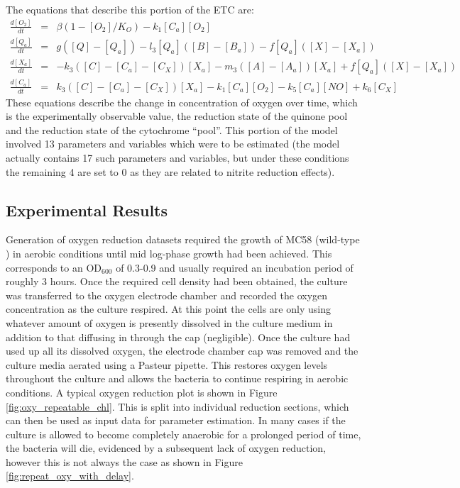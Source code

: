 The equations that describe this portion of the ETC are:
\begin{eqnarray*}
\frac{d[O_2]}{dt} & = & \beta(1-[O_2]/K_O) - k_{1}[C_a][O_2]\\
\frac{d[Q_a]}{dt} & = & g([Q] - [Q_a]) - l_3[Q_a]([B] - [B_a]) - f[Q_a]([X]-[X_a])\\
\frac{d[X_a]}{dt} & = & -k_3([C] - [C_a] - [C_X])[X_a]  - m_3([A] - [A_a])[X_a] + f[Q_a]([X]-[X_a])\\
\frac{d[C_a]}{dt} & = & k_3([C] - [C_a] - [C_X])[X_a] - k_{1}[C_a][O_2] - k_5[C_a][NO] + k_6[C_X]
\end{eqnarray*}
These equations describe the change in concentration of oxygen over time, which is the experimentally observable value, the reduction state of the quinone pool and the reduction state of the cytochrome ``pool''. This portion of the model involved 13 parameters and variables which were to be estimated (the model actually contains 17 such parameters and variables, but under these conditions the remaining 4 are set to 0 as they are related to nitrite reduction effects).

\subsection{Experimental Results}
Generation of oxygen reduction datasets required the growth of MC58 (wild-type \Nsm{}) in aerobic conditions until mid log-phase growth had been achieved. This corresponds to an $\mathrm{OD}_{600}$ of 0.3-0.9 and usually required an incubation period of roughly 3 hours. Once the required cell density had been obtained, the  culture was transferred to the oxygen electrode chamber and recorded the oxygen concentration as the culture respired. At this point the cells are only using whatever amount of oxygen is presently dissolved in the culture medium in addition to that diffusing in through the cap (negligible). Once the culture had used up all its dissolved oxygen, the electrode chamber cap was removed and the culture media aerated using a Pasteur pipette. This restores oxygen levels throughout the culture and allows the bacteria to continue respiring in aerobic conditions. A typical oxygen reduction plot is shown in Figure \ref{fig:oxy_repeatable_chl}. This is split into individual reduction sections, which can then be used as input data for parameter estimation. In many cases if the culture is allowed to become completely anaerobic for a prolonged period of time, the bacteria will die, evidenced by a subsequent lack of oxygen reduction, however this is not always the case as shown in Figure \ref{fig:repeat_oxy_with_delay}.

